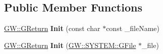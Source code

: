 \subsection*{Public Member Functions}
\begin{DoxyCompactItemize}
\item 
\hyperlink{namespaceGW_a67a839e3df7ea8a5c5686613a7a3de21}{G\+W\+::\+G\+Return} {\bfseries Init} (const char $\ast$const \+\_\+file\+Name)\hypertarget{classLogFile_a3347793c16a8888a130b10404c9e5ece}{}\label{classLogFile_a3347793c16a8888a130b10404c9e5ece}

\item 
\hyperlink{namespaceGW_a67a839e3df7ea8a5c5686613a7a3de21}{G\+W\+::\+G\+Return} {\bfseries Init} (\hyperlink{classGW_1_1SYSTEM_1_1GFile}{G\+W\+::\+S\+Y\+S\+T\+E\+M\+::\+G\+File} $\ast$\+\_\+file)\hypertarget{classLogFile_afd658429cf77f9bbf48e2ebb72b9c6e2}{}\label{classLogFile_afd658429cf77f9bbf48e2ebb72b9c6e2}


\end{DoxyCompactItemize}
